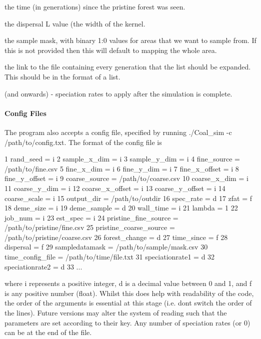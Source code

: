 \begin{DoxyEnumerate}
\item the time (in generations) since the pristine forest was seen.
\item the dispersal L value (the width of the kernel.
\item the sample mask, with binary 1\+:0 values for areas that we want to sample from. If this is not provided then this will default to mapping the whole area.
\item the link to the file containing every generation that the list should be expanded. This should be in the format of a list.
\item (and onwards) -\/ speciation rates to apply after the simulation is complete.
\end{DoxyEnumerate}

\paragraph*{Config Files}

The program also accepts a config file, specified by running {\ttfamily ./\+Coal\+\_\+sim -\/c /path/to/config.txt}. The format of the config file is 
\begin{DoxyCode}
1 rand\_seed = i
2 sample\_x\_dim = i
3 sample\_y\_dim = i
4 fine\_source = /path/to/fine.csv
5 fine\_x\_dim = i
6 fine\_y\_dim = i
7 fine\_x\_offset = i
8 fine\_y\_offset = i
9 coarse\_source = /path/to/coarse.csv
10 coarse\_x\_dim = i
11 coarse\_y\_dim = i
12 coarse\_x\_offset = i
13 coarse\_y\_offset = i
14 coarse\_scale = i
15 output\_dir = /path/to/outdir
16 spec\_rate = d
17 zfat = f
18 deme\_size = i
19 deme\_sample = d
20 wall\_time = i
21 lambda = 1
22 job\_num = i
23 est\_spec = i
24 pristine\_fine\_source = /path/to/pristine/fine.csv
25 pristine\_coarse\_source = /path/to/pristine/coarse.csv
26 forest\_change = d
27 time\_since = f
28 dispersal = f
29 sampledatamask = /path/to/sample/mask.csv
30 time\_config\_file = /path/to/time/file.txt
31 speciationrate1 = d
32 speciationrate2 = d
33 ...
\end{DoxyCode}
 where {\ttfamily i} represents a positive integer, {\ttfamily d} is a decimal value between 0 and 1, and {\ttfamily f} is any positive number (float). Whilst this does help with readability of the code, the order of the arguments is essential at this stage (i.\+e. don\textquotesingle{}t switch the order of the lines). Future versions may alter the system of reading such that the parameters are set according to their key. Any number of speciation rates (or 0) can be at the end of the file.

